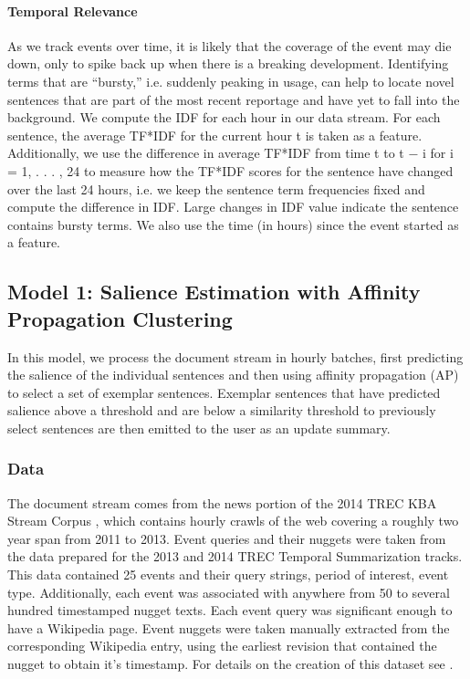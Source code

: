\paragraph{Temporal Relevance} As we track
events over time, it is likely that the coverage of
the event may die down, only to spike back up
when there is a breaking development. Identifying
terms that are “bursty,” i.e. suddenly peaking
in usage, can help to locate novel sentences that
are part of the most recent reportage and have yet
to fall into the background.
We compute the IDF for each hour in our data
stream. For each sentence, the average TF*IDF
for the current hour t is taken as a feature. Additionally,
we use the difference in average TF*IDF
from time t to t − i for i = {1, . . . , 24} to measure
how the TF*IDF scores for the sentence have
changed over the last 24 hours, i.e. we keep the
sentence term frequencies fixed and compute the
difference in IDF. Large changes in IDF value indicate
the sentence contains bursty terms. We also
use the time (in hours) since the event started as a
feature.


\subsection{Model 1: Salience Estimation with Affinity Propagation Clustering}

  In this model, we process the document stream in hourly batches, 
  first predicting the salience of the individual sentences and then 
  using affinity propagation (AP) to select a set of exemplar sentences.
  Exemplar sentences that have predicted salience above a threshold 
  and are below a similarity threshold to previously select sentences are
  then emitted to the user as an update summary.

  
\subsubsection{Data}

  The document stream comes from the news portion of the 2014 TREC
KBA Stream Corpus \cite{frank_et_al_2012}, which contains hourly crawls
of the web covering a roughly two year span from 2011 to 2013.
Event queries and their nuggets were taken from the data prepared for 
the 2013 and 2014 TREC Temporal Summarization tracks. This data
contained 25 events and their query strings, period of interest, 
event type. 
Additionally, each event was associated with anywhere from 50 to several
hundred timestamped nugget texts. Each event query was significant 
enough to have a Wikipedia page. Event nuggets were taken manually
extracted from the corresponding Wikipedia entry, using the earliest
revision that contained the nugget to obtain it's timestamp.
For details on the creation of this dataset see \cite{aslam_et_al_2013}.

